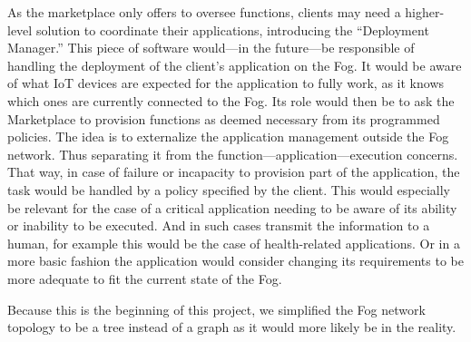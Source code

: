 As the marketplace only offers to oversee functions, clients may need a higher-level solution to coordinate their applications, introducing the “Deployment Manager.” This piece of software would—in the future—be responsible of handling the deployment of the client's application on the Fog. It would be aware of what \gls{IoT} devices are expected for the application to fully work, as it knows which ones are currently connected to the Fog. Its role would then be to ask the Marketplace to provision functions as deemed necessary from its programmed policies. The idea is to externalize the application management outside the Fog network. Thus separating it from the function—application—execution concerns. That way, in case of failure or incapacity to provision part of the application, the task would be handled by a policy specified by the client. This would especially be relevant for the case of a critical application needing to be aware of its ability or inability to be executed. And in such cases transmit the information to a human, for example this would be the case of health-related applications. Or in a more basic fashion the application would consider changing its requirements to be more adequate to fit the current state of the Fog.

Because this is the beginning of this project, we simplified the Fog network topology to be a tree instead of a graph as it would more likely be in the reality.


